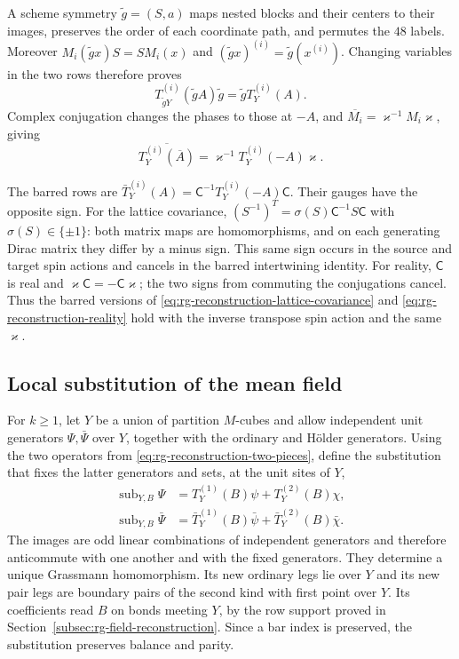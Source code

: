 A scheme symmetry $\tilde g=(S,a)$ maps nested blocks and their
centers to their images, preserves the order of each coordinate
path, and permutes the $48$ labels. Moreover
$M_i(\tilde gx)S=SM_i(x)$ and
$(\tilde gx)^{(i)}=\tilde g(x^{(i)})$.
Changing variables in the two rows therefore proves
\begin{equation}\label{eq:rg-reconstruction-lattice-covariance}
 T_{\tilde gY}^{(i)}(\tilde gA)\tilde g
                           =\tilde gT_Y^{(i)}(A).
\end{equation}
Complex conjugation changes the phases to those at $-A$, and
$\overline{M_i}=\varkappa^{-1}M_i\varkappa$, giving
\begin{equation}\label{eq:rg-reconstruction-reality}
 \overline{T_Y^{(i)}(\overline A)}
                         =\varkappa^{-1}T_Y^{(i)}(-A)\varkappa.
\end{equation}

The barred rows are $\bar T_Y^{(i)}(A)=\mathsf C^{-1}T_Y^{(i)}(-A)\mathsf C$.
Their gauges have the opposite sign. For the lattice covariance,
$(S^{-1})^T=\sigma(S)\mathsf C^{-1}S\mathsf C$ with
$\sigma(S)\in\{\pm1\}$: both matrix maps are homomorphisms,
and on each generating Dirac matrix they differ by a minus
sign. This same sign occurs in the source and target spin
actions and cancels in the barred intertwining identity.
For reality, $\mathsf C$ is real and
$\varkappa\mathsf C=-\mathsf C\varkappa$; the two signs from
commuting the conjugations cancel. Thus the barred versions
of \eqref{eq:rg-reconstruction-lattice-covariance} and
\eqref{eq:rg-reconstruction-reality} hold with the inverse
transpose spin action and the same $\varkappa$.


\subsection{Local substitution of the mean field}
\label{subsec:rg-step-local-substitution}

For $k\ge1$, let $Y$ be a union of partition $M$-cubes and allow independent
unit generators $\Psi,\bar\Psi$ over $Y$, together
with the ordinary and H\"older generators.
Using the two operators from
\eqref{eq:rg-reconstruction-two-pieces}, define
the substitution that fixes the latter generators and
sets, at the unit sites of $Y$,
\begin{equation}\label{eq:rg-step-local-substitution}
 \begin{split}
 \operatorname{sub}_{Y,B}\Psi
       &=T_Y^{(1)}(B)\psi+T_Y^{(2)}(B)\chi,\\
 \operatorname{sub}_{Y,B}\bar\Psi
       &=\bar T_Y^{(1)}(B)\bar\psi+\bar T_Y^{(2)}(B)\bar\chi.
 \end{split}
\end{equation}
The images are odd linear combinations of independent
generators and therefore anticommute with one another
and with the fixed generators. They determine a
unique Grassmann homomorphism.
Its new ordinary legs lie over $Y$ and its new pair
legs are boundary pairs of the second kind with first
point over $Y$. Its coefficients read $B$ on bonds
meeting $Y$, by the row support proved in
Section~\ref{subsec:rg-field-reconstruction}.
Since a bar index is preserved, the substitution
preserves balance and parity.

